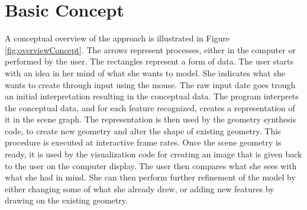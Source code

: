 \documentclass[a4paper,12pt]{report}
\begin{document}
\section{Basic Concept}
\label{sec:concept}
 A conceptual overview of the approach is illustrated in Figure \ref{fig:overviewConcept}. The arrows represent processes, either in the computer or performed by the user. The rectangles represent a form of data. The user starts with an idea in her mind of what she wants to model. She indicates what she wants to create through input using the mouse. The raw input date goes trough an initial interpretation resulting in the conceptual data. The program interprets the conceptual data, and for each feature recognized, creates a representation of it in the scene graph. The representation is then used by the geometry synthesis code, to create new geometry and alter the shape of existing geometry. This procedure is executed at interactive frame rates. Once the scene geometry is ready, it is used by the visualization code for creating an image that is given back to the user on the computer display. The user then compares what she sees with what she had in mind. She can then perform further refinement of the model by either changing some of what she already drew, or adding new 
features by drawing on the existing geometry. %
\end{document}
